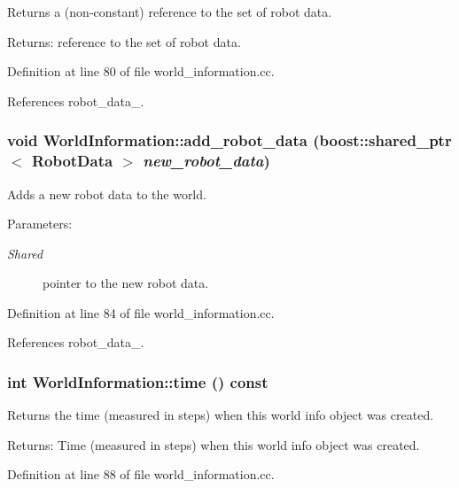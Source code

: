 Returns a (non-constant) reference to the set of robot data. \begin{Desc}
\item[Returns:]reference to the set of robot data. \end{Desc}


Definition at line 80 of file world\_\-information.cc.

References robot\_\-data\_\-.\hypertarget{class_world_information_1772ce91751ea42cb9ecdd23c697089a}{
\subsubsection[add\_\-robot\_\-data]{\setlength{\rightskip}{0pt plus 5cm}void WorldInformation::add\_\-robot\_\-data (boost::shared\_\-ptr$<$ {\bf RobotData} $>$ {\em new\_\-robot\_\-data})}}
\label{class_world_information_1772ce91751ea42cb9ecdd23c697089a}


Adds a new robot data to the world. \begin{Desc}
\item[Parameters:]
\begin{description}
\item[{\em Shared}]pointer to the new robot data. \end{description}
\end{Desc}


Definition at line 84 of file world\_\-information.cc.

References robot\_\-data\_\-.\hypertarget{class_world_information_a20e784bfc5405883fa99313de3137ac}{
\subsubsection[time]{\setlength{\rightskip}{0pt plus 5cm}int WorldInformation::time () const}}
\label{class_world_information_a20e784bfc5405883fa99313de3137ac}


Returns the time (measured in steps) when this world info object was created. \begin{Desc}
\item[Returns:]Time (measured in steps) when this world info object was created. \end{Desc}


Definition at line 88 of file world\_\-information.cc.

